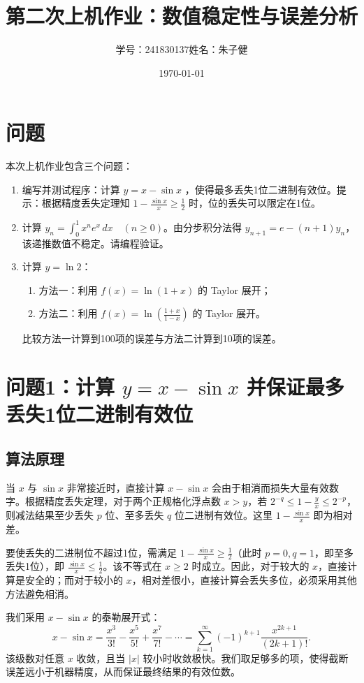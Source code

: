 \documentclass{article}
\title{第二次上机作业：数值稳定性与误差分析}
\author{学号：241830137\quad 姓名：朱子健}
\date{\today}
\begin{document}
\maketitle

\section{问题}
本次上机作业包含三个问题：
\begin{enumerate}[(1)]
    \item 编写并测试程序：计算 \(y = x - \sin x\) ，使得最多丢失1位二进制有效位。提示：根据精度丢失定理知 \(1 - \frac{\sin x}{x} \geq \frac{1}{2}\) 时，位的丢失可以限定在1位。
    \item 计算 \(y_n = \int_0^1 x^n e^x \, dx \quad (n \geq 0)\)。由分步积分法得 \(y_{n+1} = e - (n+1)y_n\)，该递推数值不稳定。请编程验证。
    \item 计算 \(y = \ln 2\)：
    \begin{enumerate}
        \item 方法一：利用 \(f(x) = \ln(1+x)\) 的 Taylor 展开；
        \item 方法二：利用 \(f(x) = \ln\left(\frac{1+x}{1-x}\right)\) 的 Taylor 展开。
    \end{enumerate}
    比较方法一计算到100项的误差与方法二计算到10项的误差。
\end{enumerate}

\section{问题1：计算 \(y = x - \sin x\) 并保证最多丢失1位二进制有效位}

\subsection{算法原理}
当 \(x\) 与 \(\sin x\) 非常接近时，直接计算 \(x - \sin x\) 会由于相消而损失大量有效数字。根据精度丢失定理，对于两个正规格化浮点数 \(x > y\)，若 \(2^{-q} \le 1 - \frac{y}{x} \le 2^{-p}\)，则减法结果至少丢失 \(p\) 位、至多丢失 \(q\) 位二进制有效位。这里 \(1 - \frac{\sin x}{x}\) 即为相对差。

要使丢失的二进制位不超过1位，需满足 \(1 - \frac{\sin x}{x} \ge \frac{1}{2}\)（此时 \(p=0, q=1\)，即至多丢失1位），即 \(\frac{\sin x}{x} \le \frac{1}{2}\)。该不等式在 \(x \ge 2\) 时成立。因此，对于较大的 \(x\)，直接计算是安全的；而对于较小的 \(x\)，相对差很小，直接计算会丢失多位，必须采用其他方法避免相消。

我们采用 \(x - \sin x\) 的泰勒展开式：
\[
x - \sin x = \frac{x^3}{3!} - \frac{x^5}{5!} + \frac{x^7}{7!} - \cdots = \sum_{k=1}^{\infty} (-1)^{k+1} \frac{x^{2k+1}}{(2k+1)!}.
\]
该级数对任意 \(x\) 收敛，且当 \(|x|\) 较小时收敛极快。我们取足够多的项，使得截断误差远小于机器精度，从而保证最终结果的有效位数。
\end{document}
